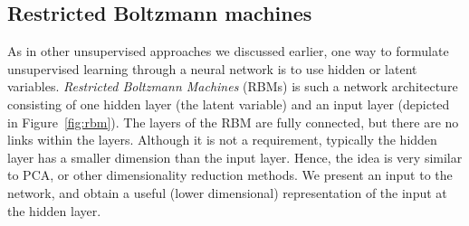 \subsection{Restricted Boltzmann machines}
As in other unsupervised approaches we discussed earlier,
one way to formulate unsupervised learning through a neural network
is to use hidden or latent variables.
\emph{Restricted Boltzmann Machines} (RBMs) is such a network architecture
consisting of one hidden layer (the latent variable)
and an input layer (depicted in Figure~\ref{fig:rbm}).
The layers of the RBM are fully connected,
but there are no links within the layers.
Although it is not a requirement,
typically the hidden layer has a smaller dimension than the input layer.
Hence, the idea is very similar to PCA,
or other dimensionality reduction methods.
We present an input to the network,
and obtain a useful (lower dimensional) representation of the input
at the hidden layer.
\begin{marginfigure}
  \centering
  \caption{%
    A schematic description of a restricted Boltzmann machine (top),
    and equivalent representation as a (undirected) graphical model (bottom).
  }\label{fig:rbm}
\end{marginfigure}

